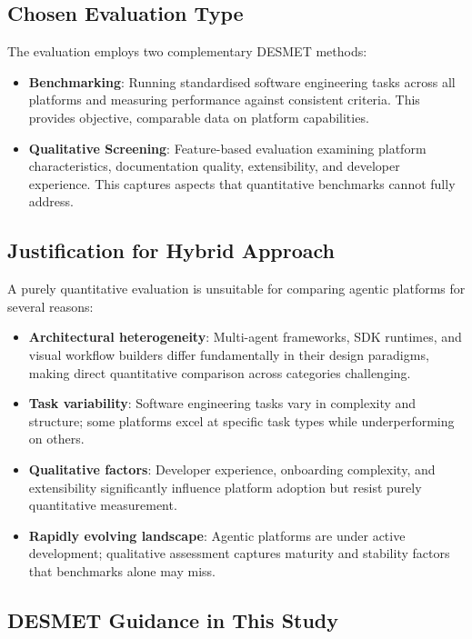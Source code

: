 \documentclass[]
{UCD_CS_FYP_Report}
\begin{document}
\subsection{Chosen Evaluation Type}

The evaluation employs two complementary DESMET methods:

\begin{itemize}
  \item \textbf{Benchmarking}: Running standardised software engineering tasks across all platforms and measuring performance against consistent criteria. This provides objective, comparable data on platform capabilities.
  \item \textbf{Qualitative Screening}: Feature-based evaluation examining platform characteristics, documentation quality, extensibility, and developer experience. This captures aspects that quantitative benchmarks cannot fully address.
\end{itemize}

\subsection{Justification for Hybrid Approach}

A purely quantitative evaluation is unsuitable for comparing agentic platforms for several reasons:

\begin{itemize}
  \item \textbf{Architectural heterogeneity}: Multi-agent frameworks, SDK runtimes, and visual workflow builders differ fundamentally in their design paradigms, making direct quantitative comparison across categories challenging.
  \item \textbf{Task variability}: Software engineering tasks vary in complexity and structure; some platforms excel at specific task types while underperforming on others.
  \item \textbf{Qualitative factors}: Developer experience, onboarding complexity, and extensibility significantly influence platform adoption but resist purely quantitative measurement.
  \item \textbf{Rapidly evolving landscape}: Agentic platforms are under active development; qualitative assessment captures maturity and stability factors that benchmarks alone may miss.
\end{itemize}

\subsection{DESMET Guidance in This Study}
\end{document}
